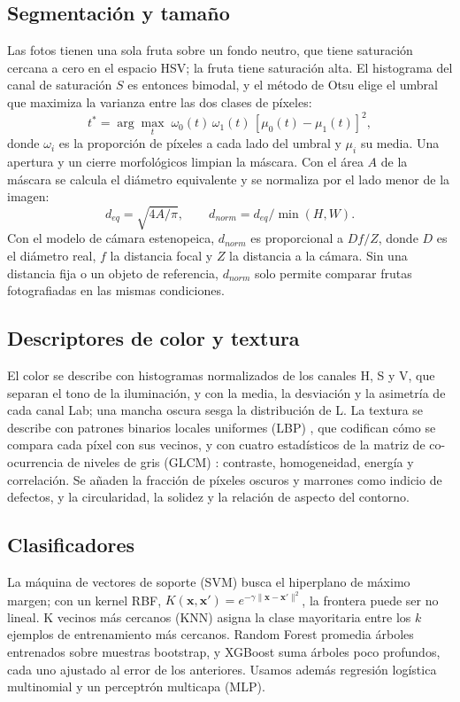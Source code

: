 \documentclass[conference]{IEEEtran}
\begin{document}
\subsection{Segmentación y tamaño}
\label{sec:seg}
Las fotos tienen una sola fruta sobre un fondo neutro, que tiene saturación cercana a cero en el espacio HSV; la fruta tiene saturación alta. El histograma del canal de saturación $S$ es entonces bimodal, y el método de Otsu \cite{otsu1979} elige el umbral que maximiza la varianza entre las dos clases de píxeles:
\begin{equation}
t^* = \arg\max_t \; \omega_0(t)\,\omega_1(t)\,[\mu_0(t)-\mu_1(t)]^2,
\end{equation}
donde $\omega_i$ es la proporción de píxeles a cada lado del umbral y $\mu_i$ su media. Una apertura y un cierre morfológicos limpian la máscara. Con el área $A$ de la máscara se calcula el diámetro equivalente y se normaliza por el lado menor de la imagen:
\begin{equation}
d_{eq}=\sqrt{4A/\pi}, \qquad d_{norm}=d_{eq}/\min(H,W).
\end{equation}
Con el modelo de cámara estenopeica, $d_{norm}$ es proporcional a $D f / Z$, donde $D$ es el diámetro real, $f$ la distancia focal y $Z$ la distancia a la cámara. Sin una distancia fija o un objeto de referencia, $d_{norm}$ solo permite comparar frutas fotografiadas en las mismas condiciones.

\subsection{Descriptores de color y textura}
\label{sec:desc}
El color se describe con histogramas normalizados de los canales H, S y V, que separan el tono de la iluminación, y con la media, la desviación y la asimetría de cada canal Lab; una mancha oscura sesga la distribución de L. La textura se describe con patrones binarios locales uniformes (LBP) \cite{ojala2002}, que codifican cómo se compara cada píxel con sus vecinos, y con cuatro estadísticos de la matriz de co-ocurrencia de niveles de gris (GLCM) \cite{haralick1973}: contraste, homogeneidad, energía y correlación. Se añaden la fracción de píxeles oscuros y marrones como indicio de defectos, y la circularidad, la solidez y la relación de aspecto del contorno.

\subsection{Clasificadores}
La máquina de vectores de soporte (SVM) \cite{cortes1995} busca el hiperplano de máximo margen; con un kernel RBF, $K(\mathbf{x},\mathbf{x}')=e^{-\gamma\|\mathbf{x}-\mathbf{x}'\|^2}$, la frontera puede ser no lineal. K vecinos más cercanos (KNN) asigna la clase mayoritaria entre los $k$ ejemplos de entrenamiento más cercanos. Random Forest \cite{breiman2001} promedia árboles entrenados sobre muestras bootstrap, y XGBoost \cite{chen2016} suma árboles poco profundos, cada uno ajustado al error de los anteriores. Usamos además regresión logística multinomial y un perceptrón multicapa (MLP).
\end{document}
